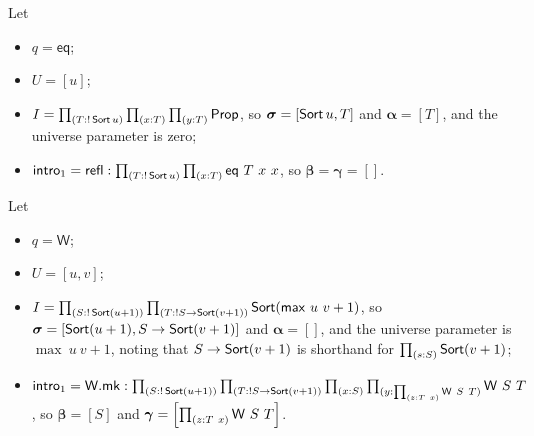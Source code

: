 \begin{eg}[equality]
	Let
	\begin{itemize}
		\item \( q = \mathsf{eq} \);
		\item \( U = [u] \);
		\item \( I = \prd{T:!\Sort u}{x:T}{y:T} \Prop \), so \( \bm \sigma = [\operatorname{\mathsf{Sort}} u, T] \) and \( \bm \alpha = [T] \), and the universe parameter is zero;
		\item \( \mathsf{intro}_1 = \mathsf{refl} : \prd{T:!\Sort u}{x:T}\mathsf{eq}\ T\ x\ x \), so \( \bm \beta = \bm \gamma = [] \).
	\end{itemize}
\end{eg}
\begin{eg}
	Let
	\begin{itemize}
		\item \( q = \mathsf{W} \);
		\item \( U = [u, v] \);
		\item \( I = \prd{S:!\Sort (u + 1)}{T:!S \to \Sort (v + 1)} \Sort (\max\ u\ v + 1) \), so \( \bm \sigma = [\operatorname{\mathsf{Sort}} (u + 1), S \to \operatorname{\mathsf{Sort}} (v + 1)] \) and \( \bm \alpha = [] \), and the universe parameter is \( \max\ u\ v + 1 \), noting that \( S \to \operatorname{\mathsf{Sort}} (v + 1) \) is shorthand for \( \prd{s:S} \Sort(v+1) \);
		\item \( \mathsf{intro}_1 = \mathsf{W.mk} : \prd{S:!\Sort (u + 1)}{T:!S \to \Sort (v + 1)}{x:S}{y:\prd{z:T\ x} \mathsf{W}\ S\ T} \mathsf{W}\ S\ T \), so \( \bm \beta = [S] \) and \( \bm \gamma = \qty[\prd{z:T\ x}\mathsf{W}\ S\ T] \).
	\end{itemize}
\end{eg}

